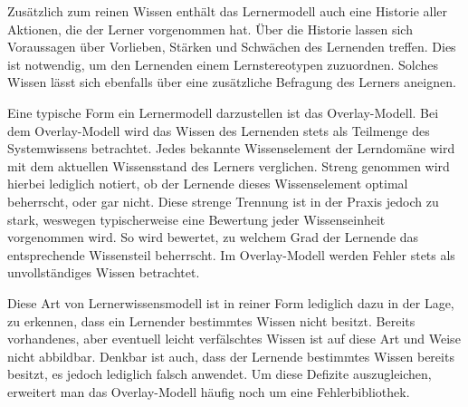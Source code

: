 Zusätzlich zum reinen Wissen enthält das Lernermodell auch eine
Historie aller Aktionen, die der Lerner vorgenommen hat. Über die Historie lassen sich Voraussagen über Vorlieben, Stärken
und Schwächen des Lernenden treffen. Dies ist notwendig, um den Lernenden einem Lernstereotypen zuzuordnen.
Solches Wissen lässt sich ebenfalls über eine zusätzliche Befragung des Lerners aneignen.

Eine typische Form ein Lernermodell darzustellen ist das Overlay-Modell.
Bei dem Overlay-Modell wird das Wissen des Lernenden stets als Teilmenge des Systemwissens betrachtet.
Jedes bekannte Wissenselement der Lerndomäne wird mit dem aktuellen Wissensstand des Lerners verglichen.
Streng genommen wird hierbei lediglich notiert, ob der Lernende dieses Wissenselement optimal beherrscht, oder gar nicht.
Diese strenge Trennung ist in der Praxis jedoch zu stark, weswegen typischerweise eine Bewertung jeder Wissenseinheit vorgenommen wird.
So wird bewertet, zu welchem Grad der Lernende das entsprechende Wissensteil beherrscht.
Im Overlay-Modell werden Fehler stets als unvollständiges Wissen betrachtet.

Diese Art von Lernerwissensmodell ist in reiner Form lediglich dazu in der Lage, zu erkennen,
dass ein Lernender bestimmtes Wissen nicht besitzt.
Bereits vorhandenes, aber eventuell leicht verfälschtes Wissen ist auf diese Art und Weise nicht abbildbar.
Denkbar ist auch, dass der Lernende bestimmtes Wissen bereits besitzt, es jedoch lediglich falsch anwendet.
Um diese Defizite auszugleichen, erweitert man das Overlay-Modell häufig noch um eine Fehlerbibliothek.

